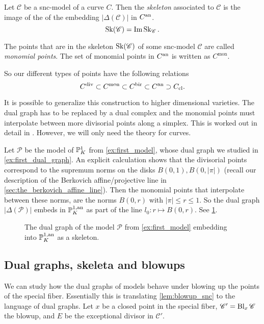\begin{definition}
	Let $\mathscr C$ be a snc-model of a curve $C$. 
	Then the \emph{skeleton} associated to $\mathscr C$ is the image of the of the embedding $|\Delta(\mathscr C)|$ in $C{}^{\text{an}}$. 
	\[
		\operatorname{Sk}(\mathscr C) = \operatorname{Im} \operatorname{Sk}_{\mathscr C}
	.\] 
\end{definition}
\begin{definition}
	The points that are in the skeleton $\operatorname{Sk}(\mathscr C)$ of some snc-model $\mathscr C$ are called \emph{monomial points}. 
	The set of monomial points in $C{}^{\text{an}}$ is written as  $C^{\text{mon}}$. 
\end{definition}

So our different types of points have the following relations \[
C^{\text{div}} \subset C^{\text{mon}} \subset C{}^{\text{bir}} \subset C{}^{\text{an}} \supset C_\text{cl}
.\] 

\begin{remark}
	It is possible to generalize this construction to higher dimensional varieties. 
	The dual graph has to be replaced by a dual complex and the monomial points must interpolate between more divisorial points along a simplex.
	This is worked out in detail in \cite{mustataWeightFunctionsNonArchimedean2015}. 
	However, we will only need the theory for curves. 
\end{remark}

\begin{example}
	Let $\mathscr P$ be the model of $\mathbb{P}^{1}_K$ from \cref{ex:first_model}, whose dual graph we studied in \cref{ex:first_dual_graph}.
	An explicit calculation shows that the divisorial points correspond to the supremum norms on the disks $B(0, 1), B(0, |\pi|)$ (recall our description of the Berkovich affine/projective line in \cref{sec:the_berkovich_affine_line}).
	Then the monomial points that interpolate between these norms, are the norms $B(0, r)$ with $|\pi| \le r \le 1$.
	So the dual graph $|\Delta(\mathscr P)|$ embeds in $\mathbb{P}_K^{1, \text{an}}$ as part of the line $l_0: r \mapsto B(0, r)$. 
	See \cref{fig:skeleton_projective_line}. 
\end{example}
\begin{figure}[ht]
    \centering
    \caption{The dual graph of the model $\mathscr P$ from \cref{ex:first_model} embedding into $\mathbb{P}_K^{1, \text{an}}$ as a skeleton.}
    \label{fig:skeleton_projective_line}
\end{figure}


\subsection{Dual graphs, skeleta and blowups} \label{sec:dual_graphs_and_blowups}
We can study how the dual graphs of models behave under blowing up the points of the special fiber.
Essentially this is translating \cref{lem:blowup_snc} to the language of dual graphs.
Let $x$ be a closed point in the special fiber, $\mathscr C' = \operatorname{Bl}_{x} \mathscr C$ the blowup, and $E$ be the exceptional divisor in $\mathscr C'$.

